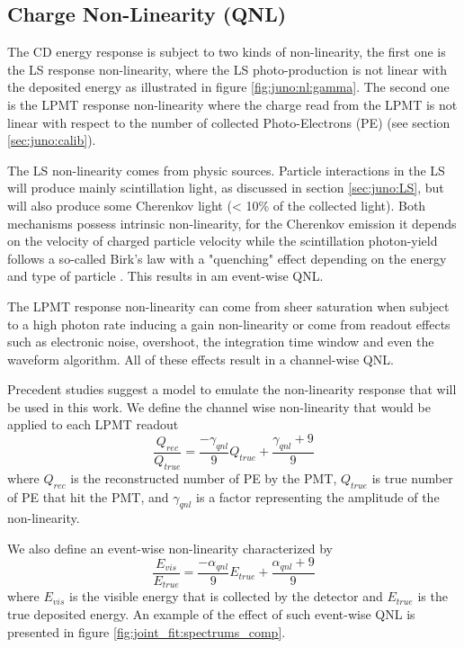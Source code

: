 \documentclass[../main.tex]{subfiles}
\begin{document}
\subsection{Charge Non-Linearity (QNL)}
\label{sec:joint_fit:qnl}

The CD energy response is subject to two kinds of non-linearity, the first one is the LS response non-linearity, where the LS photo-production is not linear with the deposited energy as illustrated in figure \ref{fig:juno:nl:gamma}. The second one is the LPMT response non-linearity where the charge read from the LPMT is not linear with respect to the number of collected Photo-Electrons (PE) (see section \ref{sec:juno:calib}).

The LS non-linearity comes from physic sources. Particle interactions in the LS will produce mainly scintillation light, as discussed in section \ref{sec:juno:LS}, but will also produce some Cherenkov light (< 10\% of the collected light). Both mechanisms possess intrinsic non-linearity, for the Cherenkov emission it depends on the velocity of charged particle velocity while the scintillation photon-yield follows a so-called Birk's law with a "quenching" effect depending on the energy and type of particle \cite{particle_data_group_review_2020}. This results in am event-wise QNL.

The LPMT response non-linearity can come from sheer saturation when subject to a high photon rate inducing a gain non-linearity or come from readout effects such as electronic noise, overshoot, the integration time window and even the waveform algorithm. All of these effects result in a channel-wise QNL.

Precedent studies \cite{han_dual_2021} suggest a model to emulate the non-linearity response that will be used in this work. We define the channel wise non-linearity that would be applied to each LPMT readout
\begin{equation}
  \label{eq:joint_fit:gamma_yang}
  \frac{Q_{rec}}{Q_{true}} = \frac{-\gamma_{qnl}}{9} Q_{true} + \frac{\gamma_{qnl} + 9}{9}
\end{equation}
where $Q_{rec}$ is the reconstructed number of PE by the PMT, $Q_{true}$ is true number of PE that hit the PMT, and $\gamma_{qnl}$ is a factor representing the amplitude of the non-linearity.

We also define an event-wise non-linearity characterized by
\begin{equation}
  \label{eq:joint_fit:alpha_yang}
  \frac{E_{vis}}{E_{true}} = \frac{-\alpha_{qnl}}{9} E_{true} + \frac{\alpha_{qnl} + 9}{9}
\end{equation}
where $E_{vis}$ is the visible energy that is collected by the detector and $E_{true}$ is the true deposited energy. An example of the effect of such event-wise QNL is presented in figure \ref{fig:joint_fit:spectrums_comp}.
\end{document}
